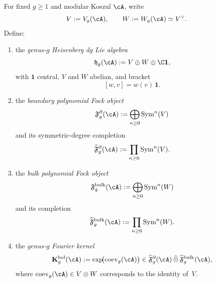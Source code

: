 \begin{definition}
\label{def:frontier-genus-g-heisenberg-package}
For fixed $g\ge 1$ and modular Koszul $\cA$, write
\[
V:=V_g(\cA),
\qquad
W:=W_g(\cA)\simeq V^\vee.
\]
Define:
\begin{enumerate}[label=\textup{(\roman*)}]
\item the \emph{genus-$g$ Heisenberg dg Lie algebra}
 \begin{equation}\label{eq:frontier-heisenberg-dg-lie}
 \mathfrak h_g(\cA):=V\oplus W\oplus \C\mathbf 1,
 \end{equation}
 with $\mathbf 1$ central, $V$ and $W$ abelian, and bracket
 \begin{equation}\label{eq:frontier-heisenberg-bracket}
 [w,v]=w(v)\,\mathbf 1.
 \end{equation}
\item the \emph{boundary polynomial Fock object}
 \begin{equation}\label{eq:frontier-boundary-fock-object}
 \mathfrak F^{\partial}_g(\cA)
 :=\bigoplus_{n\ge 0}\operatorname{Sym}^n(V)
 \end{equation}
 and its symmetric-degree completion
 \begin{equation}\label{eq:frontier-completed-boundary-fock-object}
 \widehat{\mathfrak F}{}^{\partial}_g(\cA)
 :=\prod_{n\ge 0}\operatorname{Sym}^n(V).
 \end{equation}
\item the \emph{bulk polynomial Fock object}
 \begin{equation}\label{eq:frontier-bulk-fock-object}
 \mathfrak F^{\mathrm{bulk}}_g(\cA)
 :=\bigoplus_{n\ge 0}\operatorname{Sym}^n(W)
 \end{equation}
 and its completion
 \begin{equation}\label{eq:frontier-completed-bulk-fock-object}
 \widehat{\mathfrak F}{}^{\mathrm{bulk}}_g(\cA)
 :=\prod_{n\ge 0}\operatorname{Sym}^n(W).
 \end{equation}
\item the \emph{genus-$g$ Fourier kernel}
 \begin{equation}\label{eq:frontier-genus-g-fourier-kernel}
 \mathbf K_g^{\mathrm{hol}}(\cA)
 :=
 \exp\!\bigl(\operatorname{coev}_g(\cA)\bigr)
 \in
 \widehat{\mathfrak F}{}^{\partial}_g(\cA)
 \,\widehat\otimes\,
 \widehat{\mathfrak F}{}^{\mathrm{bulk}}_g(\cA),
 \end{equation}
 where $\operatorname{coev}_g(\cA)\in V\otimes W$ corresponds to the identity
 of~$V$.
\end{enumerate}
\end{definition}

